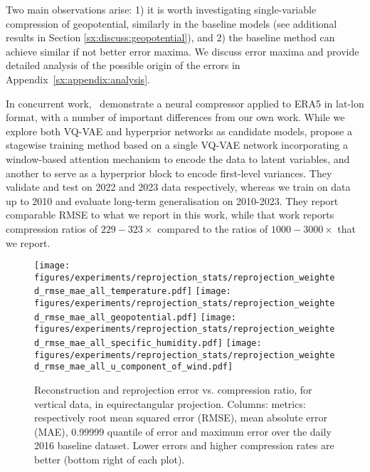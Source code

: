Two main observations arise: 1) it is worth investigating single-variable compression of geopotential, similarly in the baseline models (see additional results in Section \ref{sx:discuss:geopotential}), and 2) the baseline method can achieve similar if not better error maxima. We discuss error maxima and provide detailed analysis of the possible origin of the errors in Appendix~\ref{sx:appendix:analysis}.

In concurrent work,~\citet{han2024cra5} demonstrate a neural compressor applied to ERA5 in lat-lon format, with a number of important differences from our own work. While we explore both VQ-VAE and hyperprior networks as candidate models, \citet{han2024cra5} propose a stagewise training method based on a single VQ-VAE network incorporating a window-based attention mechanism to encode the data to latent variables, and another to serve as a hyperprior block to encode first-level variances.
They validate and test on 2022 and 2023 data respectively, whereas we train on data up to 2010 and evaluate long-term generalisation on 2010-2023.
They report comparable RMSE to what we report in this work, while that work reports compression ratios of $229-323\times$ compared to the ratios of $1000-3000\times$ that we report.

\begin{figure}
    \centering
    \texttt{[image: figures/experiments/reprojection\_stats/reprojection\_weighted\_rmse\_mae\_all\_temperature.pdf]}
    \texttt{[image: figures/experiments/reprojection\_stats/reprojection\_weighted\_rmse\_mae\_all\_geopotential.pdf]}
    \texttt{[image: figures/experiments/reprojection\_stats/reprojection\_weighted\_rmse\_mae\_all\_specific\_humidity.pdf]}
    \texttt{[image: figures/experiments/reprojection\_stats/reprojection\_weighted\_rmse\_mae\_all\_u\_component\_of\_wind.pdf]}
    \hfill
    \caption{Reconstruction and reprojection error vs. compression ratio, for vertical data, in equirectangular projection. Columns: metrics: respectively root mean squared error (RMSE), mean absolute error (MAE), 0.99999 quantile of error and maximum error over the daily 2016 baseline dataset. Lower errors and higher compression rates are better (bottom right of each plot).}
    \label{fig:reprojection_error_vs_cr}
\end{figure}


